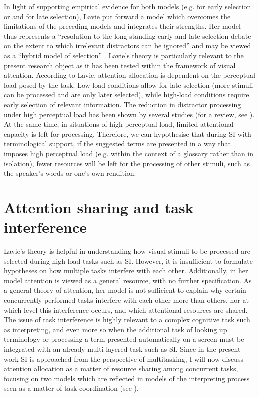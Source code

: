 In light of supporting empirical evidence for both models (e.g. \citealt{simons_gorillas_1999} for early selection or \citealt{stroop_studies_1935} and \citealt{eriksen_effects_1974} for late selection), Lavie put forward a model which overcomes the limitations of the preceding models and integrates their strengths. Her model thus represents a ``resolution to the long-standing early and late selection debate on the extent to which irrelevant distractors can be ignored'' and may be viewed as a ``hybrid model of selection'' \citep[353]{lavie_load_2004}. Lavie's theory is particularly relevant to the present research object as it has been tested within the framework of visual attention. According to Lavie, attention allocation is dependent on the perceptual load posed by the task. Low-load conditions allow for late selection (more stimuli can be processed and are only later selected), while high-load conditions require early selection of relevant information. The reduction in distractor processing under high perceptual load has been shown by several studies (for a review, see \citealt{lavie_distracted_2005}). At the same time, in situations of high perceptual load, limited attentional capacity is left for processing. Therefore, we can hypothesise that during SI with terminological support, if the suggested terms are presented in a way that imposes high perceptual load (e.g. within the context of a glossary rather than in isolation), fewer resources will be left for the processing of other stimuli, such as the speaker's words or one's own rendition.



\section{Attention sharing and task interference} \label{interference}
Lavie's theory is helpful in understanding how visual stimuli to be processed are selected during high-load tasks such as SI. However, it is insufficient to formulate hypotheses on how multiple tasks interfere with each other. Additionally, in her model attention is viewed as a general resource, with no further specification. As a general theory of attention, her model is not sufficient to explain why certain concurrently performed tasks interfere with each other more than others, nor at which level this interference occurs, and which attentional resources are shared. The issue of task interference is highly relevant to a complex cognitive task such as interpreting, and even more so when the additional task of looking up terminology or processing a term presented automatically on a screen must be integrated with an already multi-layered task such as SI. Since in the present work SI is approached from the perspective of multitasking, I will now discuss attention allocation as a matter of resource sharing among concurrent tasks, focusing on two models which are reflected in models of the interpreting process seen as a matter of task coordination (see ).

